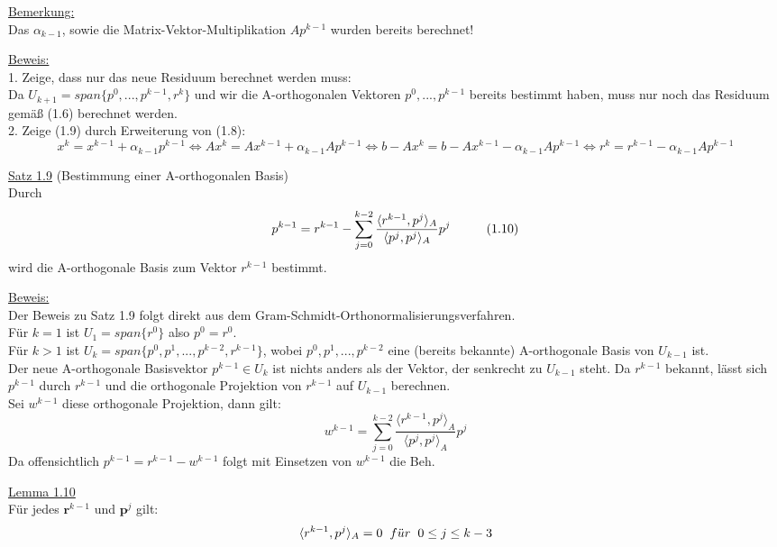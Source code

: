 \documentclass[a4paper]{letter}
\begin{document}
\underline{Bemerkung:}
\\Das $\alpha_{k-1}$, sowie die Matrix-Vektor-Multiplikation $Ap^{k-1}$ wurden bereits berechnet!

\underline{Beweis:}
\\1. Zeige, dass nur das neue Residuum berechnet werden muss:
\\Da $U_{k+1} = span\{p^{0},...,p^{k-1},r^{k}\}$ und wir die A-orthogonalen Vektoren $p^{0},...,p^{k-1}$ bereits bestimmt haben, muss nur noch das Residuum gem\"a{\ss} (1.6) berechnet werden.
\\2. Zeige (1.9) durch Erweiterung von (1.8):
$$x^{k} = x^{k-1} + \alpha_{k-1}p^{k-1}
\Longleftrightarrow Ax^{k} = Ax^{k-1} + \alpha_{k-1}Ap^{k-1}
\Longleftrightarrow b - Ax^{k} = b - Ax^{k-1} - \alpha_{k-1}Ap^{k-1}
\Longleftrightarrow r^{k} = r^{k-1} - \alpha_{k-1}Ap^{k-1}$$

\underline{Satz 1.9} (Bestimmung einer A-orthogonalen Basis)
\\Durch
$$p^{k-1} = r^{k-1} - \sum_{j=0}^{k-2} \frac {\langle r^{k-1}, p^{j} \rangle _{A}} {\langle p^{j}, p^{j} \rangle _{A}} p^{j} \hspace{10mm} (1.10)$$
wird die A-orthogonale Basis zum Vektor $r^{k-1}$ bestimmt.

\underline{Beweis:}
\\Der Beweis zu Satz 1.9 folgt direkt aus dem Gram-Schmidt-Orthonormalisierungsverfahren.
\\F\"ur $k = 1$ ist $U_{1} = span\{r^{0}\}$ also $p^{0} = r^{0}$.
\\F\"ur $k > 1$ ist $U_{k} = span\{p^{0}, p^{1}, ...,p^{k-2}, r^{k-1}\}$, wobei $p^{0}, p^{1}, ..., p^{k-2}$ eine (bereits bekannte) A-orthogonale Basis von $U_{k-1}$ ist.
\\Der neue A-orthogonale Basisvektor $p^{k-1} \in U_{k}$ ist nichts anders als der Vektor, der senkrecht zu $U_{k-1}$ steht. Da $r^{k-1}$ bekannt, l\"asst sich $p^{k-1}$ durch $r^{k-1}$ und die orthogonale Projektion von $r^{k-1}$ auf $U_{k-1}$ berechnen.
\\Sei $w^{k-1}$ diese orthogonale Projektion, dann gilt:
$$w^{k-1} = \sum_{j=0}^{k-2} \frac {\langle r^{k-1}, p^{j} \rangle _{A}} {\langle p^{j}, p^{j} \rangle _{A}} p^{j}$$
Da offensichtlich $p^{k-1} = r^{k-1} - w^{k-1}$ folgt mit Einsetzen von $w^{k-1}$ die Beh.

\underline{Lemma 1.10}
\\F\"ur jedes $\textbf{r}^{k-1}$ und $\textbf{p}^{j}$ gilt:
$$\langle r^{k-1}, p^{j} \rangle _{A} = 0 \hspace{2mm} f\ddot{u}r \hspace{2mm} 0 \le j \le k-3$$
\end{document}
